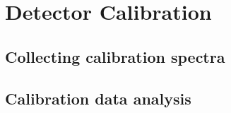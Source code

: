 \chapter{Detector Calibration\label{chap:calib}}

\section{Collecting calibration spectra}

\section{Calibration data analysis}

